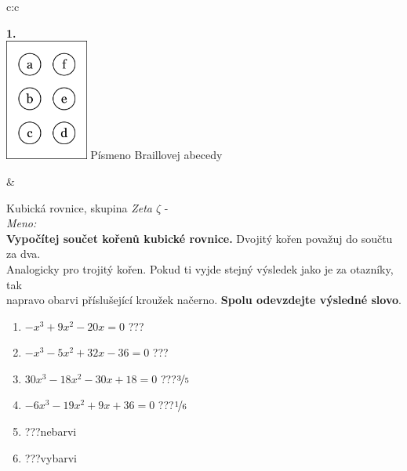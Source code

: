 \documentclass[10pt]{report}
\begin{document}
\begin{tabular}{c:c}
\begin{minipage}[c][99mm][t]{0.49\linewidth}
\begin{center}
\begin{minipage}{0.20\linewidth}
\begin{center}
{\Huge\bfseries 1.} \\[2mm]
\includegraphics[height=40mm]{../images/braille.png}
{\small Písmeno Braillovej abecedy}
\end{center}
\end{minipage}
\end{center}
\end{minipage}
&
\begin{minipage}[c][99mm][t]{0.49\linewidth}
\begin{center}
\vspace{7mm}
{\huge Kubická rovnice, skupina \textit{Zeta $\zeta$} -}\\[4.5mm]
\textit{Meno:}\phantom{xxxxxxxxxxxxxxxxxxxxxxxxxxxxxxxxxxxxxxxxxxxxxxxxxxxxxxxxxxxxxxxxx}\\[3.5mm]
\textbf{Vypočítej součet kořenů kubické rovnice.} Dvojitý kořen považuj do součtu za dva.\\Analogicky pro trojitý kořen. Pokud ti vyjde stejný výsledek jako je za otazníky, tak\\napravo obarvi příslušející kroužek načerno. \textbf{Spolu odevzdejte výsledné slovo}.\\[3mm]
\begin{minipage}{0.77\linewidth}
\begin{center}
\begin{varwidth}{\textwidth}
\begin{enumerate}
\large
\item $-x^3+9x^2-20x=0$\quad \dotfill\; ???\;\dotfill {}
\item $-x^3-5x^2+32x-36=0$\quad \dotfill\; ???\;\dotfill {}
\item $30x^3-18x^2-30x+18=0$\quad \dotfill\; ???\;\dotfill \quad $\nicefrac{3}{5}$
\item $-6x^3-19x^2+9x+36=0$\quad \dotfill\; ???\;\dotfill \quad $\nicefrac{1}{6}$
\item \quad \dotfill\; ???\;\dotfill \quad nebarvi
\item \quad \dotfill\; ???\;\dotfill \quad vybarvi
\end{enumerate}

\end{varwidth}
\end{center}
\end{minipage}
\end{center}
\end{minipage}
\end{tabular}
\end{document}
